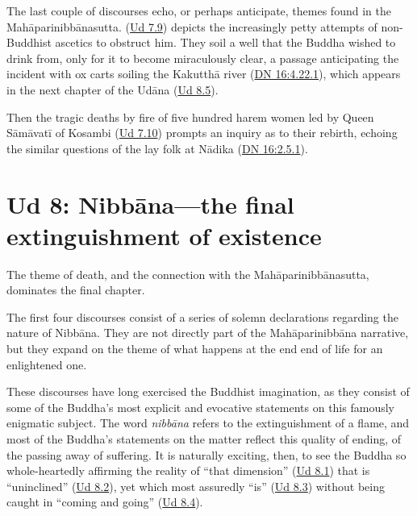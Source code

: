 \documentclass[12pt,openany]{book}%
\begin{document}
The last couple of discourses echo, or perhaps anticipate, themes found in the \textsanskrit{Mahāparinibbānasutta}. (\href{https://suttacentral.net/ud7.9/en/sujato}{Ud 7.9}) depicts the increasingly petty attempts of non-Buddhist ascetics to obstruct him. They soil a well that the Buddha wished to drink from, only for it to become miraculously clear, a passage anticipating the incident with ox carts soiling the \textsanskrit{Kakutthā} river (\href{https://suttacentral.net/dn16/en/sujato\#4.22.1}{DN 16:4.22.1}), which appears in the next chapter of the \textsanskrit{Udāna} (\href{https://suttacentral.net/ud8.5/en/sujato}{Ud 8.5}). 

Then the tragic deaths by fire of five hundred harem women led by Queen \textsanskrit{Sāmāvatī} of Kosambi (\href{https://suttacentral.net/ud7.10/en/sujato}{Ud 7.10}) prompts an inquiry as to their rebirth, echoing the similar questions of the lay folk at \textsanskrit{Nādika} (\href{https://suttacentral.net/dn16/en/sujato\#2.5.1}{DN 16:2.5.1}). 

\section*{Ud 8: \textsanskrit{Nibbāna}—the final extinguishment of existence}

The theme of death, and the connection with the \textsanskrit{Mahāparinibbānasutta}, dominates the final chapter. 

The first four discourses consist of a series of solemn declarations regarding the nature of \textsanskrit{Nibbāna}. They are not directly part of the \textsanskrit{Mahāparinibbāna} narrative, but they expand on the theme of what happens at the end end of life for an enlightened one. 

These discourses have long exercised the Buddhist imagination, as they consist of some of the Buddha’s most explicit and evocative statements on this famously enigmatic subject. The word \textit{\textsanskrit{nibbāna}} refers to the extinguishment of a flame, and most of the Buddha’s statements on the matter reflect this quality of ending, of the passing away of suffering. It is naturally exciting, then, to see the Buddha so whole-heartedly affirming the reality of “that dimension” (\href{https://suttacentral.net/ud8.1/en/sujato}{Ud 8.1}) that is “uninclined” (\href{https://suttacentral.net/ud8.2/en/sujato}{Ud 8.2}), yet which most assuredly “is” (\href{https://suttacentral.net/ud8.3/en/sujato}{Ud 8.3}) without being caught in “coming and going” (\href{https://suttacentral.net/ud8.4/en/sujato}{Ud 8.4}). 
\end{document}

